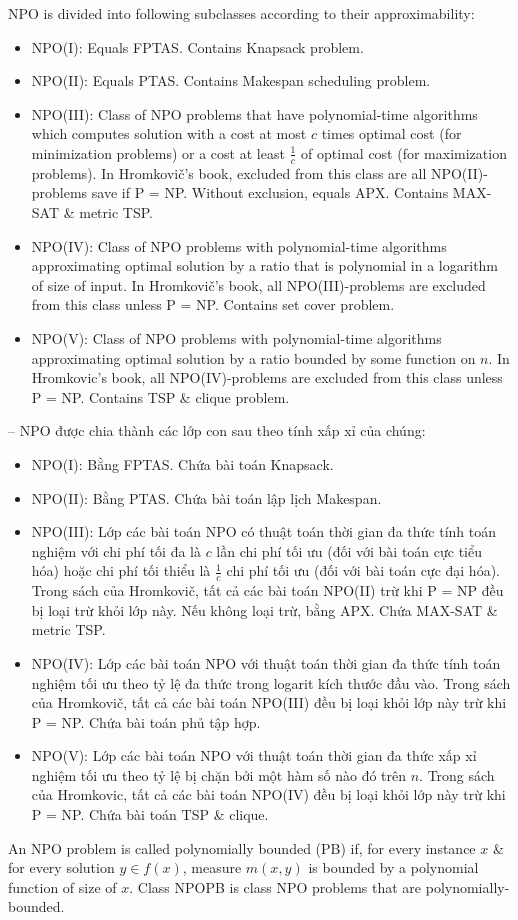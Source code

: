 \documentclass{article}
\begin{document}
NPO is divided into following subclasses according to their approximability:
\begin{itemize}
    \item NPO(I): Equals FPTAS. Contains Knapsack problem.
    \item NPO(II): Equals PTAS. Contains Makespan scheduling problem.
    \item NPO(III): Class of NPO problems that have polynomial-time algorithms which computes solution with a cost at most $c$ times optimal cost (for minimization problems) or a cost at least $\frac{1}{c}$ of optimal cost (for maximization problems). In Hromkovič's book, excluded from this class are all NPO(II)-problems save if P = NP. Without exclusion, equals APX. Contains MAX-SAT \& metric TSP.
    \item NPO(IV): Class of NPO problems with polynomial-time algorithms approximating optimal solution by a ratio that is polynomial in a logarithm of size of input. In Hromkovič's book, all NPO(III)-problems are excluded from this class unless P = NP. Contains set cover problem.
    \item NPO(V): Class of NPO problems with polynomial-time algorithms approximating optimal solution by a ratio bounded by some function on $n$. In Hromkovic's book, all NPO(IV)-problems are excluded from this class unless P = NP. Contains TSP \& clique problem.
\end{itemize}
-- NPO được chia thành các lớp con sau theo tính xấp xỉ của chúng:
\begin{itemize}
    \item NPO(I): Bằng FPTAS. Chứa bài toán Knapsack.
    \item NPO(II): Bằng PTAS. Chứa bài toán lập lịch Makespan.
    \item NPO(III): Lớp các bài toán NPO có thuật toán thời gian đa thức tính toán nghiệm với chi phí tối đa là $c$ lần chi phí tối ưu (đối với bài toán cực tiểu hóa) hoặc chi phí tối thiểu là $\frac{1}{c}$ chi phí tối ưu (đối với bài toán cực đại hóa). Trong sách của Hromkovič, tất cả các bài toán NPO(II) trừ khi P = NP đều bị loại trừ khỏi lớp này. Nếu không loại trừ, bằng APX. Chứa MAX-SAT \& metric TSP.
    \item NPO(IV): Lớp các bài toán NPO với thuật toán thời gian đa thức tính toán nghiệm tối ưu theo tỷ lệ đa thức trong logarit kích thước đầu vào. Trong sách của Hromkovič, tất cả các bài toán NPO(III) đều bị loại khỏi lớp này trừ khi P = NP. Chứa bài toán phủ tập hợp.
    \item NPO(V): Lớp các bài toán NPO với thuật toán thời gian đa thức xấp xỉ nghiệm tối ưu theo tỷ lệ bị chặn bởi một hàm số nào đó trên $n$. Trong sách của Hromkovic, tất cả các bài toán NPO(IV) đều bị loại khỏi lớp này trừ khi P = NP. Chứa bài toán TSP \& clique.
\end{itemize}
An NPO problem is called polynomially bounded (PB) if, for every instance $x$ \& for every solution $y\in f(x)$, measure $m(x,y)$ is bounded by a polynomial function of size of $x$. Class NPOPB is class NPO problems that are polynomially-bounded.
\end{document}
